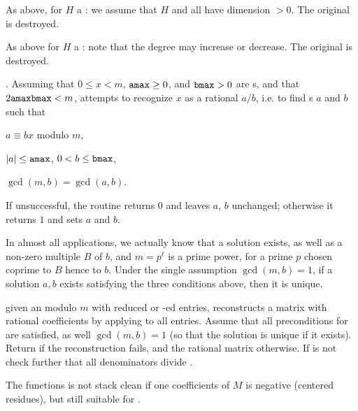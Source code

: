As above, for $H$ a : we assume that $H$ and all  have
dimension $> 0$. The original  is destroyed.



As above for $H$ a : note that the degree may increase or decrease.
The original  is destroyed.




.
Assuming that $0 \leq x < m$, ${\tt amax} \geq 0$, and
${\tt bmax} > 0$ are s, and that $2 {\tt amax} {\tt bmax} < m$,
attempts to recognize $x$ as a rational $a/b$, i.e. to find s $a$
and $b$ such that

\item $a \equiv b x$ modulo $m$,

\item $|a| \leq {\tt amax}$, $0 < b \leq {\tt bmax}$,

\item $\gcd(m,b) = \gcd(a,b)$.

\noindent If unsuccessful, the routine returns $0$ and leaves $a$, $b$
unchanged; otherwise it returns $1$ and sets $a$ and $b$.

In almost all applications, we actually know that a solution exists, as well
as a non-zero multiple $B$ of $b$, and $m = p^\ell$ is a prime power, for a
prime $p$ chosen coprime to $B$ hence to $b$. Under the single assumption
$\gcd(m,b) = 1$, if a solution $a,b$ exists satisfying the three conditions
above, then it is unique.

given an  modulo $m$ with reduced or -ed entries,
reconstructs a matrix with rational coefficients by applying 
to all entries. Assume that all preconditions for  are
satisfied, as well $\gcd(m,b) = 1$ (so that the solution is unique if it
exists). Return  if the reconstruction fails, and the rational
matrix otherwise. If  is not  check further that all
denominators divide .

The functions is not stack clean if one coefficients of $M$ is negative
(centered residues), but still suitable for .

